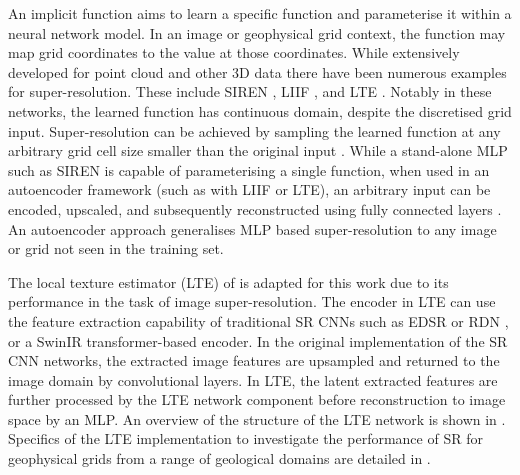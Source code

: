 An implicit function aims to learn a specific function and parameterise it within a neural network model.
In an image or geophysical grid context, the function may map grid coordinates to the value at those coordinates.
While extensively developed for point cloud and other 3D data \parencite[e.g.][]{jiangLocalImplicitGrid2020} there have been numerous examples for super-resolution.
These include SIREN \parencite{sitzmann2019siren}, LIIF \parencite{chenLearningContinuousImage2021}, and LTE \parencite{leeLocalTextureEstimator2022}.
Notably in these networks, the learned function has continuous domain, despite the discretised grid input.
Super-resolution can be achieved by sampling the learned function at any arbitrary grid cell size smaller than the original input \parencite{chenLearningContinuousImage2021}.
While a stand-alone MLP such as SIREN is capable of parameterising a single function, when used in an autoencoder framework (such as with LIIF or LTE), an arbitrary input can be encoded, upscaled, and subsequently reconstructed using fully connected layers .
An autoencoder approach generalises MLP based super-resolution to any image or grid not seen in the training set.

The local texture estimator (LTE) of \parencite{leeLocalTextureEstimator2022} is adapted for this work due to its performance in the task of image super-resolution.
The encoder in LTE can use the feature extraction capability of traditional SR CNNs such as EDSR \parencite{limEnhancedDeepResidual2017} or RDN \parencite{zhangResidualDenseNetwork2018}, or a SwinIR \parencite{liangSwinIRImageRestoration2021} transformer-based encoder.
In the original implementation of the SR CNN networks, the extracted image features are upsampled and returned to the image domain by convolutional layers.
In LTE, the latent extracted features are further processed by the LTE network component before reconstruction to image space by an MLP\@.
An overview of the structure of the LTE network is shown in .
Specifics of the LTE implementation to investigate the performance of SR for geophysical grids from a range of geological domains are detailed in .

